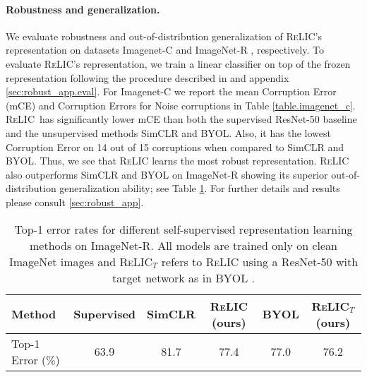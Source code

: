 \documentclass{article}
\newcommand{\relic}{\textsc{ReLIC}}
\begin{document}
\paragraph{Robustness and generalization.}
We evaluate robustness and out-of-distribution generalization of \relic{}'s representation on datasets Imagenet-C \citep{hendrycks2019robustness} and ImageNet-R \citep{hendrycks2020many}, respectively. 
To evaluate \relic{}'s representation, we train a linear classifier on top of the frozen representation following the procedure described in \citep{chen2020simple} and appendix \ref{sec:robust_app.eval}. 
For Imagenet-C we report the mean Corruption Error (mCE) and Corruption Errors for Noise corruptions in Table \ref{table.imagenet_c}.
\relic \, has significantly lower mCE than both the supervised ResNet-50 baseline and the unsupervised methods SimCLR and BYOL. 
Also, it has the lowest Corruption Error on 14 out of 15 corruptions when compared to SimCLR and BYOL.
Thus, we see that \relic{} learns the most robust representation. 
\relic \, also outperforms SimCLR and BYOL on ImageNet-R showing its superior out-of-distribution generalization ability; see Table \ref{table.imagenet_r}.
For further details and results please consult \ref{sec:robust_app}.

\begin{table}[ht]
\caption{Top-1 error rates for different self-supervised representation learning methods on ImageNet-R. All models are trained only on clean ImageNet images and \relic{}$_{T}$ refers to \relic{} using a ResNet-50 with target network as in BYOL \citep{grill2020bootstrap}.}
\label{table.imagenet_r}
\begin{center}
\begin{tabular}{lccccc}
\hline
Method & Supervised & SimCLR & \relic{} (ours) & BYOL & \relic{}$_{T}$ (ours) \\
\hline
Top-1 Error (\%) & 63.9 & 81.7 & 77.4 & 77.0 & 76.2  \\
\hline
\end{tabular}
\end{center}
\end{table}
\end{document}
